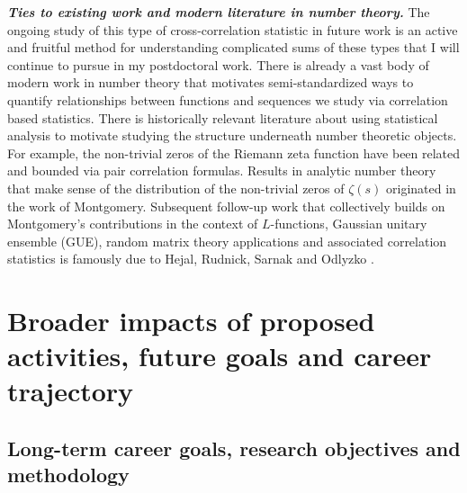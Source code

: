 \documentclass[10pt,reqno,letterpaper]{article}
\theoremstyle{plain}
\numberwithin{theorem}{section}
\theoremstyle{definition}
\begin{document}
\vskip -0.5mm
\noindent
{\normalsize \textbf{\emph{Ties to existing work and modern literature in number theory.}}} 
The ongoing study of this type of cross-correlation statistic in future work is an active and 
fruitful method for understanding complicated sums of these types 
that I will continue to pursue in my postdoctoral work. 
There is already a vast body of modern work in number theory that motivates 
semi-standardized ways to quantify relationships between functions and sequences we study via 
correlation based statistics. There is historically relevant literature about using 
statistical analysis to motivate studying the structure underneath number theoretic objects. 
For example, the non-trivial zeros of the Riemann zeta function have been related and 
bounded via pair correlation formulas. 
Results in analytic number theory that make sense of the distribution of the 
non-trivial zeros of $\zeta(s)$ originated in the work of Montgomery. 
Subsequent follow-up work that collectively builds on Montgomery’s contributions in the 
context of $L$-functions, Gaussian unitary ensemble (GUE), 
random matrix theory applications and associated correlation statistics is 
famously due to Hejal, Rudnick, Sarnak and Odlyzko 
\cite{WILLIAMS-BARRETT-SURVEY-2016}. 

\section{Broader impacts of proposed activities, future goals and career trajectory}

\subsection{Long-term career goals, research objectives and methodology} 
\end{document}
